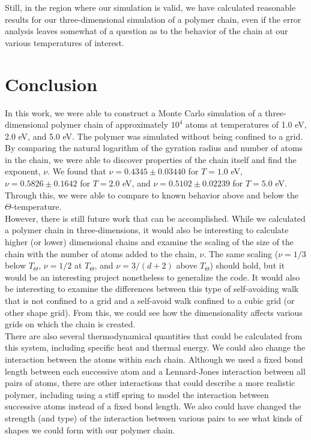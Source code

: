 \documentclass{article}
\begin{document}
\begin{multicols}{2}
Still, in the region where our simulation is valid, we have calculated reasonable results for our three-dimensional simulation of a polymer chain, even if the error analysis leaves somewhat of a question as to the behavior of the chain at our various temperatures of interest.   \\

\section{Conclusion}
\label{concl}

In this work, we were able to construct a Monte Carlo simulation of a three-dimensional polymer chain of approximately $10^4$ atoms at temperatures of 1.0 eV, 2.0 eV, and 5.0 eV.  The polymer was simulated without being confined to a grid.  By comparing the natural logarithm of the gyration radius and number of atoms in the chain, we were able to discover properties of the chain itself and find the exponent, $\nu$.  We found that $\nu = 0.4345 \pm 0.03440$ for $T = 1.0 $ eV, $\nu = 0.5826 \pm 0.1642$ for $T =2.0$ eV, and $\nu = 0.5102 \pm 0.02239$ for $T=5.0$ eV.  Through this, we were able to compare to known behavior above and below the $\Theta$-temperature.  \\

However, there is still future work that can be accomplished.  While we calculated a polymer chain in three-dimensions, it would also be interesting to calculate higher (or lower) dimensional chains and examine the scaling of the size of the chain with the number of atoms added to the chain, $\nu$.  The same scaling ($\nu = 1/3$ below $T_\Theta$, $\nu = 1/2$ at $T_\Theta$, and $\nu = 3/(d+2)$ above $T_\Theta$) should hold, but it would be an interesting project nonetheless to generalize the code.  It would also be interesting to examine the differences between this type of self-avoiding walk that is not confined to a grid and a self-avoid walk confined to a cubic grid (or other shape grid).  From this, we could see how the dimensionality affects various grids on which the chain is created.  \\

There are also several thermodynamical quantities that could be calculated from this system, including specific heat and thermal energy.  We could also change the interaction between the atoms within each chain.  Although we used a fixed bond length between each successive atom and a Lennard-Jones interaction between all pairs of atoms, there are other interactions that could describe a more realistic polymer, including using a stiff spring to model the interaction between successive atoms instead of a fixed bond length.  We also could have changed the strength (and type) of the interaction between various pairs to see what kinds of shapes we could form with our polymer chain.  \\


\end{multicols}
\end{document}
